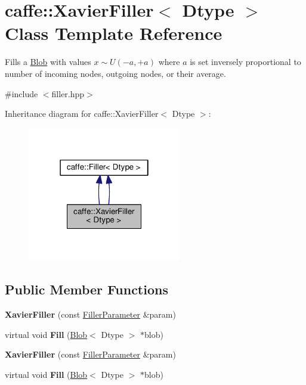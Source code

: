 \hypertarget{classcaffe_1_1_xavier_filler}{}\section{caffe\+:\+:Xavier\+Filler$<$ Dtype $>$ Class Template Reference}
\label{classcaffe_1_1_xavier_filler}


Fills a \mbox{\hyperlink{classcaffe_1_1_blob}{Blob}} with values $ x \sim U(-a, +a) $ where $ a $ is set inversely proportional to number of incoming nodes, outgoing nodes, or their average.  




{\ttfamily \#include $<$filler.\+hpp$>$}



Inheritance diagram for caffe\+:\+:Xavier\+Filler$<$ Dtype $>$\+:
\nopagebreak
\begin{figure}[H]
\begin{center}
\leavevmode
\includegraphics[width=190pt]{classcaffe_1_1_xavier_filler__inherit__graph}
\end{center}
\end{figure}
\subsection*{Public Member Functions}
\begin{DoxyCompactItemize}
\item 
\mbox{\label{classcaffe_1_1_xavier_filler_a4145fb1bb9e5c543a07da69ae3b2eec6}} 
{\bfseries Xavier\+Filler} (const \mbox{\hyperlink{classcaffe_1_1_filler_parameter}{Filler\+Parameter}} \&param)
\item 
\mbox{\label{classcaffe_1_1_xavier_filler_af61c37b2a24ebc70c9e7d2d3d703d2c8}} 
virtual void {\bfseries Fill} (\mbox{\hyperlink{classcaffe_1_1_blob}{Blob}}$<$ Dtype $>$ $\ast$blob)
\item 
\mbox{\label{classcaffe_1_1_xavier_filler_a4145fb1bb9e5c543a07da69ae3b2eec6}} 
{\bfseries Xavier\+Filler} (const \mbox{\hyperlink{classcaffe_1_1_filler_parameter}{Filler\+Parameter}} \&param)
\item 
\mbox{\label{classcaffe_1_1_xavier_filler_af61c37b2a24ebc70c9e7d2d3d703d2c8}} 
virtual void {\bfseries Fill} (\mbox{\hyperlink{classcaffe_1_1_blob}{Blob}}$<$ Dtype $>$ $\ast$blob)
\end{DoxyCompactItemize}
